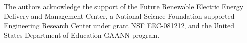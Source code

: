 The authors acknowledge the support of the Future Renewable
Electric Energy Delivery and Management Center,
a National Science Foundation supported Engineering Research
Center under grant NSF EEC-081212, and the United States Department of Education GAANN program.
